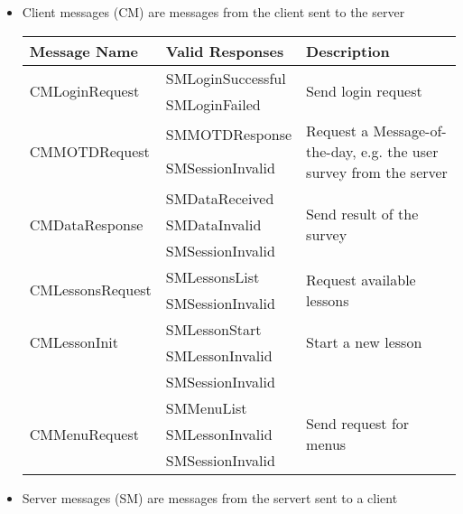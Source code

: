 \documentclass{scrartcl}
\begin{document}
\begin{itemize}
\item Client messages (CM) are messages from the client sent to the server

  \begin{tabular}{llp{}}
    Message Name                      & Valid Responses   & Description \\
    \hline
    \multirow{2}{*}{CMLoginRequest}   & SMLoginSuccessful & \multirow{2}{*}{Send login request} \\
                                      & SMLoginFailed \\
    \hline
    \multirow{2}{*}{CMMOTDRequest}    & SMMOTDResponse    & \multirow{2}{0.6\textwidth}{Request a Message-of-the-day, e.g. the user survey from the server} \\
                                      & SMSessionInvalid \\
    \hline
    \multirow{3}{*}{CMDataResponse}   & SMDataReceived    & \multirow{3}{*}{Send result of the survey} \\
                                      & SMDataInvalid \\
                                      & SMSessionInvalid \\
    \hline
    \multirow{2}{*}{CMLessonsRequest} & SMLessonsList     & \multirow{2}{*}{Request available lessons} \\
                                      & SMSessionInvalid \\
    \hline
    \multirow{2}{*}{CMLessonInit}     & SMLessonStart     & \multirow{2}{*}{Start a new lesson} \\
                                      & SMLessonInvalid \\
                                      & SMSessionInvalid \\
    \hline
    \multirow{3}{*}{CMMenuRequest}    & SMMenuList        & \multirow{3}{*}{Send request for menus} \\
                                      & SMLessonInvalid \\
                                      & SMSessionInvalid \\
  \hline
\end{tabular}

\item Server messages (SM) are messages from the servert sent to a client


\end{itemize}
\end{document}
